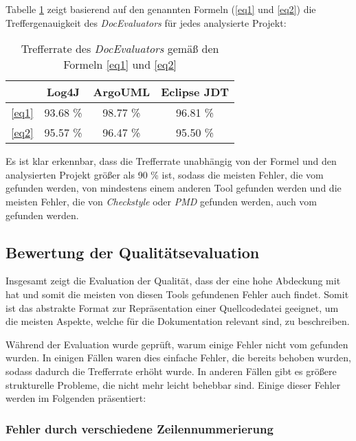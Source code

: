 Tabelle \ref{tab:hit_rate} zeigt basierend auf den genannten Formeln (\ref{eq1} und \ref{eq2}) die Treffergenauigkeit des \textit{DocEvaluators} für jedes analysierte Projekt:
\begin{table}[]
    \centering
    \begin{tabular}{c|c|c|c}
     & Log4J & ArgoUML & Eclipse \ac{JDT} \\ \hline
    \ref{eq1} &   93.68 \% &	98.77 \% &	96.81 \% \\\hline
     \ref{eq2} & 95.57 \% &	96.47 \% &	95.50 \% \\\hline

    \end{tabular}
    \caption{Trefferrate des \textit{DocEvaluators} gemäß den Formeln \ref{eq1} und \ref{eq2}}
    \label{tab:hit_rate}
\end{table}
Es ist klar erkennbar, dass die Trefferrate unabhängig von der Formel und den analysierten Projekt größer als 90 \% ist, sodass die meisten Fehler, die vom \doceval gefunden werden, von mindestens einem anderen Tool gefunden werden und die meisten Fehler, die von \textit{Checkstyle} oder \textit{PMD} gefunden werden, auch vom \doceval gefunden werden.






\subsection{Bewertung der Qualitätsevaluation}
Insgesamt zeigt die Evaluation der Qualität, dass der \doceval eine hohe Abdeckung mit \checkpmd hat und somit die meisten von diesen Tools gefundenen Fehler auch findet. Somit ist das abstrakte Format zur Repräsentation einer Quellcodedatei geeignet, um die meisten Aspekte, welche für die Dokumentation relevant sind, zu beschreiben. 

Während der Evaluation wurde geprüft, warum einige Fehler nicht vom \doceval gefunden wurden. In einigen Fällen waren dies einfache Fehler, die bereits behoben wurden, sodass dadurch die Trefferrate erhöht wurde. In anderen Fällen gibt es größere strukturelle Probleme, die nicht mehr leicht behebbar sind. Einige dieser Fehler werden im Folgenden präsentiert: 
\subsubsection{Fehler durch verschiedene Zeilennummerierung}

